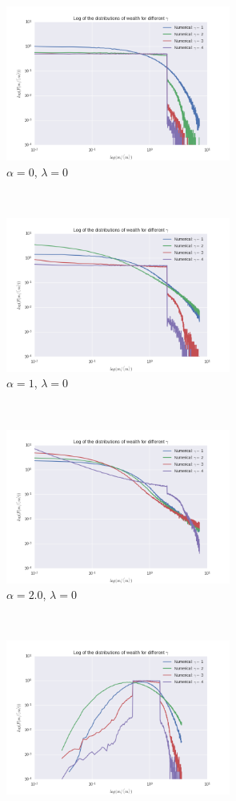 \documentclass[a4paper, 10pt]{article}
\begin{document}
\begin{figure}[!ht] %
	\centering
    \begin{subfigure}[H!]{0.5\textwidth}
    	\centering
    	\includegraphics[height=2.0in]{logDistGammasA0.png}
    	\caption{$\alpha = 0$, $\lambda=0$}
    \end{subfigure}%
    ~
    \begin{subfigure}[H!]{0.5\textwidth}
        \centering
        \includegraphics[height=2.0in]{logDistGammasA1.png} %
        \caption{$\alpha = 1$, $\lambda=0$}\label{fig:ModelD_dist_1_log}
    \end{subfigure}
    ~ 
     \begin{subfigure}[H!]{0.5\textwidth}
        \centering
        \includegraphics[height=2.0in]{logDistGammasA2.png}
        \caption{$\alpha = 2.0$, $\lambda=0$}
    \end{subfigure}%
    ~
       \begin{subfigure}[H!]{0.5\textwidth}
        \centering
        \includegraphics[height=2.0in]{logDistGammasA1L05.png}

\end{subfigure}
\end{figure}
\end{document}
